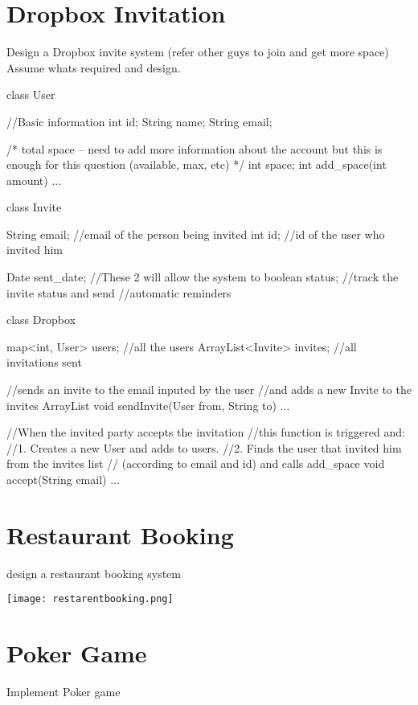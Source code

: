 \section{Dropbox Invitation}
Design a Dropbox invite system (refer other guys to join and get more space)
Assume whats required and design.

\begin{Code}
	class User {
		//Basic information
		int      id;
		String name;
		String email;
		
		/* total space -- need to add more information about the account
		but this is enough for this question (available, max, etc)
		*/
		int space;
		int add_space(int amount) {...}
	}
	
	class Invite {
		String email; //email of the person being invited
		int    id;    //id of the user who invited him
		
		Date   sent_date; //These 2 will allow the system to
		boolean status;   //track the invite status and send
		//automatic reminders
	}
	
	class Dropbox {
		map<int, User> users;   //all the users
		ArrayList<Invite> invites; //all invitations sent
		
		//sends an invite to the email inputed by the user
		//and adds a new Invite to the invites ArrayList
		void sendInvite(User from, String to) {...}
		
		//When the invited party accepts the invitation
		//this function is triggered and:
		//1. Creates a new User and adds to users.
		//2. Finds the user that invited him from the invites list
		//   (according to email and id) and calls add_space
		void accept(String email) {...}
	}
\end{Code}

\section{Restaurant Booking}
design a restaurant booking system

\begin{center}
	\texttt{[image: restarentbooking.png]}\\
	\label{fig:rbooking}
\end{center}

\section{Poker Game}
Implement Poker game

